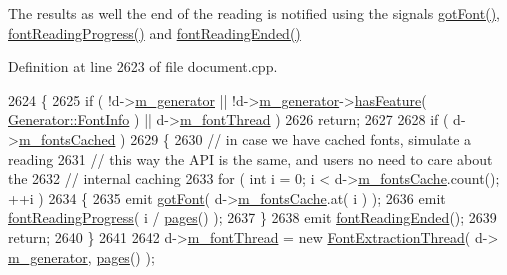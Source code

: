 The results as well the end of the reading is notified using the signals \hyperlink{classOkular_1_1Document_a66902f0fbc6c9068568f8a1eb923583d}{got\+Font()}, \hyperlink{classOkular_1_1Document_aa264e97a1d3dd36aab35fd3a09511b5b}{font\+Reading\+Progress()} and \hyperlink{classOkular_1_1Document_a098247701022e6c967299abd01ce3265}{font\+Reading\+Ended()} 

Definition at line 2623 of file document.\+cpp.


\begin{DoxyCode}
2624 \{
2625     \textcolor{keywordflow}{if} ( !d->\hyperlink{classOkular_1_1DocumentPrivate_a52083f79ce95756ddea060e74315e91f}{m\_generator} || !d->\hyperlink{classOkular_1_1DocumentPrivate_a52083f79ce95756ddea060e74315e91f}{m\_generator}->\hyperlink{classOkular_1_1Generator_aacad530ef4f0c31a4addc89eb85ec8da}{hasFeature}( 
      \hyperlink{classOkular_1_1Generator_a8517096896273a5ba5b970be09313c77a8b712b2b89239900d3d0d000280efa36}{Generator::FontInfo} ) || d->\hyperlink{classOkular_1_1DocumentPrivate_a7d89f5349531b52b4109855269a6a4c4}{m\_fontThread} )
2626         \textcolor{keywordflow}{return};
2627 
2628     \textcolor{keywordflow}{if} ( d->\hyperlink{classOkular_1_1DocumentPrivate_aa33ab887df80e7df7c9d7a5eecff000e}{m\_fontsCached} )
2629     \{
2630         \textcolor{comment}{// in case we have cached fonts, simulate a reading}
2631         \textcolor{comment}{// this way the API is the same, and users no need to care about the}
2632         \textcolor{comment}{// internal caching}
2633         \textcolor{keywordflow}{for} ( \textcolor{keywordtype}{int} i = 0; i < d->\hyperlink{classOkular_1_1DocumentPrivate_a9be70502279da0a275889e504409c7e5}{m\_fontsCache}.count(); ++i )
2634         \{
2635             emit \hyperlink{classOkular_1_1Document_a66902f0fbc6c9068568f8a1eb923583d}{gotFont}( d->\hyperlink{classOkular_1_1DocumentPrivate_a9be70502279da0a275889e504409c7e5}{m\_fontsCache}.at( i ) );
2636             emit \hyperlink{classOkular_1_1Document_aa264e97a1d3dd36aab35fd3a09511b5b}{fontReadingProgress}( i / \hyperlink{classOkular_1_1Document_aaf5d986758e25127946986abaa401bcd}{pages}() );
2637         \}
2638         emit \hyperlink{classOkular_1_1Document_a098247701022e6c967299abd01ce3265}{fontReadingEnded}();
2639         \textcolor{keywordflow}{return};
2640     \}
2641 
2642     d->\hyperlink{classOkular_1_1DocumentPrivate_a7d89f5349531b52b4109855269a6a4c4}{m\_fontThread} = \textcolor{keyword}{new} \hyperlink{classOkular_1_1FontExtractionThread}{FontExtractionThread}( d->
      \hyperlink{classOkular_1_1DocumentPrivate_a52083f79ce95756ddea060e74315e91f}{m\_generator}, \hyperlink{classOkular_1_1Document_aaf5d986758e25127946986abaa401bcd}{pages}() );

\end{DoxyCode}
